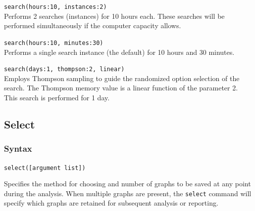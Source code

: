 	\begin{example}
	
		\item{\texttt{search(hours:10, instances:2)}\\ Performs 2 searches (instances) for 
		10 hours each. These searches will be performed simultaneously if the computer 
		capacity allows.}
				
		\item{\texttt{search(hours:10, minutes:30)}\\ Performs a single search instance 
		(the default) for 10 hours and 30 minutes.}
		
		\item{\texttt{search(days:1, thompson:2, linear)}\\ Employs Thompson sampling 
		to guide the randomized option selection of the search. The Thompson memory 
		value is a linear function of the parameter 2. This search is performed for 1 day.}
		
	\end{example}
	
\subsection{Select}
	\subsubsection{Syntax}
		\texttt{select([argument list])}
	
	\begin{phygdescription}
		{Specifies the method for choosing and number of graphs to be saved at any point 
		during the analysis. When multiple graphs are present, the \texttt{select} command 
		will specify which graphs are retained for subsequent analysis or reporting.}
	\end{phygdescription}
				
